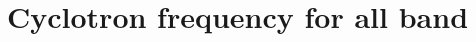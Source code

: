 \documentclass{report}
\newcommand{\f}[2]{\dfrac{#1}{#2}}
\begin{document}
\chapter{Cyclotron frequency for all band}
\end{document}
